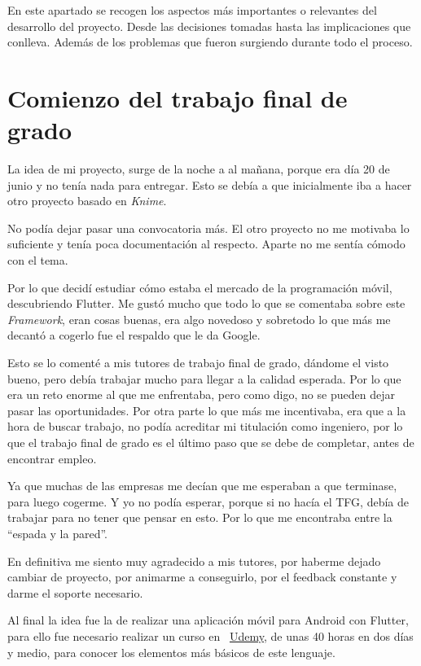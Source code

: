 
En este apartado se recogen los aspectos más importantes o relevantes del desarrollo del proyecto. Desde las decisiones tomadas hasta las implicaciones que conlleva. Además de los problemas que fueron surgiendo durante todo el proceso.

\section{Comienzo del trabajo final de grado}
La idea de mi proyecto, surge de la noche a al mañana, porque era día 20 de junio y no tenía nada para entregar. Esto se debía a que inicialmente iba a hacer otro proyecto basado en \emph{Knime}.

No podía dejar pasar una convocatoria más. El otro proyecto no me motivaba lo suficiente y tenía poca documentación al respecto. Aparte no me sentía cómodo con el tema.

Por lo que decidí estudiar cómo estaba el mercado de la programación móvil, descubriendo Flutter. Me gustó mucho que todo lo que se comentaba sobre este \emph{Framework}, eran cosas buenas, era algo novedoso y sobretodo lo que más me decantó a cogerlo fue el respaldo que le da Google.

Esto se lo comenté a mis tutores de trabajo final de grado, dándome el visto bueno, pero debía trabajar mucho para llegar a la calidad esperada. Por lo que era un reto enorme al que me enfrentaba, pero como digo, no se pueden dejar pasar las oportunidades. Por otra parte lo que más me incentivaba, era que a la hora de buscar trabajo, no podía acreditar mi titulación como ingeniero, por lo que el trabajo final de grado es el último paso que se debe de completar, antes de encontrar empleo.

Ya que muchas de las empresas me decían que me esperaban a que terminase, para luego cogerme. Y yo no podía esperar, porque si no hacía el TFG, debía de trabajar para no tener que pensar en esto. Por lo que me encontraba entre la ``espada y la pared''.

En definitiva me siento muy agradecido a mis tutores, por haberme dejado cambiar de proyecto, por animarme a conseguirlo, por el feedback constante y darme el soporte necesario.

Al final la idea fue la de realizar una aplicación móvil para Android con Flutter, para ello fue necesario realizar un curso en ~\href{https://www.udemy.com/course/flutter-primeros-pasos/}{Udemy}, de unas 40 horas en dos días y medio, para conocer los elementos más básicos de este lenguaje.

